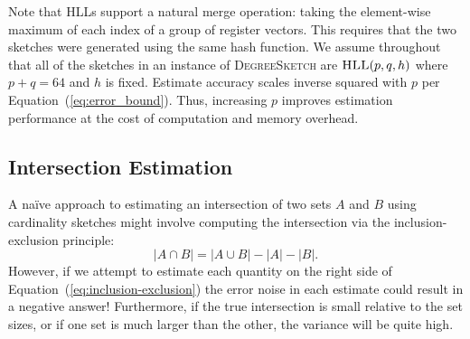 \documentclass{vldb}
\newcommand{\algoname}[1]{\textnormal{\textsc{#1}}}
\begin{document}
Note that \algoname{HLL}s support a natural merge operation: taking the element-wise maximum of each index of a group of register vectors.
This requires that the two sketches were generated using the same hash function.
We assume throughout that all of the sketches in an instance of \algoname{DegreeSketch} are $\algoname{HLL}(p, q, h)$ where $p + q = 64$ and $h$ is fixed.
Estimate accuracy scales inverse squared with $p$ per Equation~(\ref{eq:error_bound}).
Thus, increasing $p$ improves estimation performance at the cost of computation and memory overhead.

\subsection{Intersection Estimation}
 \label{sec:HLL:intersection}

A na\"ive approach to estimating an intersection of two sets $A$ and $B$ using cardinality sketches might involve computing the intersection via the inclusion-exclusion principle:
%
\begin{equation} \label{eq:inclusion-exclusion}
	|A \cap B| = |A \cup B| - |A| - |B|.
\end{equation}
%
However, if we attempt to estimate each quantity on the right side of Equation~(\ref{eq:inclusion-exclusion})  the error noise in each estimate could result in a negative answer!
Furthermore, if the true intersection is small relative to the set sizes, or if one set is much larger than the other, the variance will be quite high.
\end{document}
